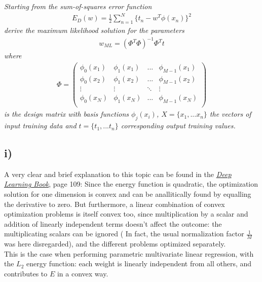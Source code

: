 \documentclass[11pt]{scrartcl} %
\begin{document}
         {\it Starting from the sum-of-squares error function
           \begin{align*}
             E_D(w) = \frac{1}{2}\sum_{n=1}^N\{t_n-w^T\phi(x_n)\}^2
           \end{align*}
           derive the maximum likelihood solution for the parameters
           \begin{align*}
             w_{ML} = (\Phi^T\Phi)^{-1}\Phi^Tt
           \end{align*}
           where
           \begin{align*}
             \Phi = \begin{pmatrix}
               \phi_0(x_1) & \phi_1(x_1) & ... & \phi_{M-1}(x_1) \\
               \phi_0(x_2) & \phi_1(x_2) & ... & \phi_{M-1}(x_2) \\
               \vdots & \vdots  & \ddots & \vdots \\
               \phi_0(x_N) & \phi_1(x_N) & ... & \phi_{M-1}(x_N) \\
             \end{pmatrix}
           \end{align*}
           is the design matrix with basis functions \(\phi_j(x_i)\), \(X=\{x_1, ... x_n\}\) the vectors
           of input training data and  \(t=\{t_1, ... t_n\}\) corresponding output training
           values.
           
           
           
         }
  

         \subsection*{i)}
         A very clear and brief explanation to this topic can be found in the \href{https://github.com/dkorolev/DeepLearningBook/blob/master/DeepLearningBook.pdf}{{\it Deep Learning Book}}, page 109: Since the energy function is quadratic, the optimization solution for one dimension is convex and can be anallitically found by equalling the derivative to zero. But furthermore, a linear combination of convex optimization problems is itself convex too, since multiplication by a scalar and addition of linearly independent terms doesn't affect the outcome: the multiplicating scalars can be ignored ( In fact, the usual normalization factor \(\frac{1}{M}\) was here disregarded), and the different problems optimized separately.\\
         This is the case when performing parametric multivariate linear regression, with the \(L_2\) energy function: each weight is linearly independent from all others, and contributes to \(E\) in a convex way.
\end{document}
